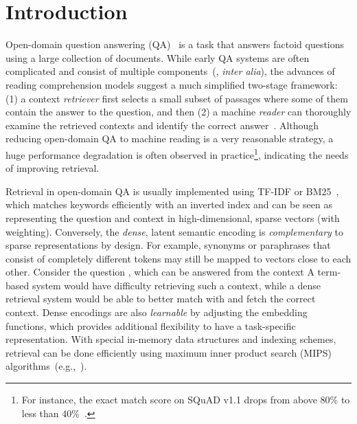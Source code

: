 
\section{Introduction}

\label{sec:intro}


Open-domain question answering (QA)~\cite{voorhees1999trec} is a task that answers factoid questions using a large collection of documents.
While early QA systems are often complicated and consist of multiple components~(\citet{ferrucci2012introduction,moldovan2003performance}, \textit{inter alia}),
the advances of reading comprehension models suggest a much simplified two-stage framework: (1) a context \emph{retriever} first selects a small subset of passages where some of them contain the answer to the question, and then (2) a machine \emph{reader} can thoroughly examine the retrieved contexts and identify the correct answer~\cite{chen2017reading}.
Although reducing open-domain QA to machine reading is a very reasonable strategy, a huge performance degradation is often observed in practice\footnote{For instance,
the exact match score on SQuAD v1.1 drops from above 80\% to less than 40\%~\cite{yang2019end}.}, indicating the needs of improving retrieval.


Retrieval in open-domain QA %
is usually implemented using TF-IDF or BM25~\cite{robertson2009probabilistic}, which matches keywords efficiently with an inverted index and can be seen
as representing the question and context in high-dimensional, sparse vectors (with weighting).
Conversely, the \emph{dense}, latent semantic encoding is \emph{complementary} to sparse representations by design.
For example, synonyms or paraphrases
that consist of completely different tokens may still be mapped to vectors close to each other.
Consider the question , which can be answered from the context
A term-based system would have difficulty retrieving such a context, while a dense retrieval system would be able to better match  with 
and fetch the correct context.
Dense encodings are also \emph{learnable} by adjusting the embedding functions, which provides additional flexibility to have a task-specific representation. With special in-memory data structures and indexing schemes, retrieval can be done efficiently using maximum inner product search (MIPS) algorithms~(e.g.,~\citet{NIPS2014_5329, guo2016quantization}).




